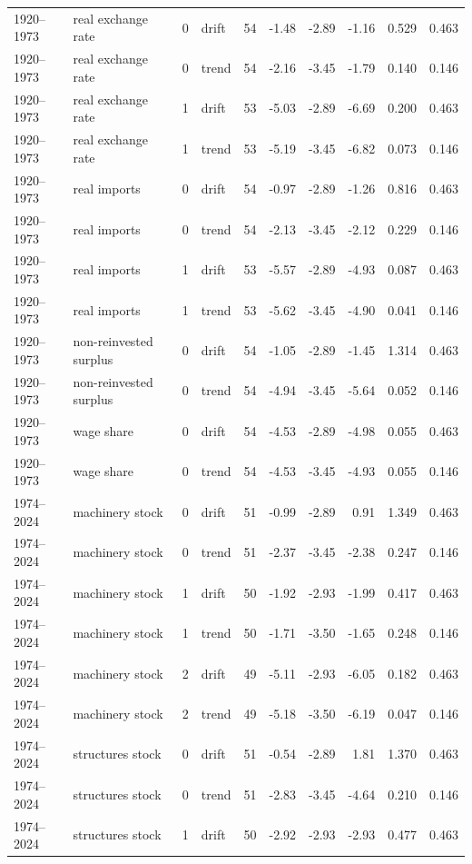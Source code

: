 \documentclass[11pt]{article}
\begin{document}
\begin{longtable}{p{1.6cm}p{3.4cm}p{0.6cm}p{1.1cm}p{0.6cm}rrrrr}
1920--1973 & real exchange rate & 0 & drift & 54 & -1.48 & -2.89 & -1.16 & 0.529 & 0.463 \\
1920--1973 & real exchange rate & 0 & trend & 54 & -2.16 & -3.45 & -1.79 & 0.140 & 0.146 \\
1920--1973 & real exchange rate & 1 & drift & 53 & -5.03 & -2.89 & -6.69 & 0.200 & 0.463 \\
1920--1973 & real exchange rate & 1 & trend & 53 & -5.19 & -3.45 & -6.82 & 0.073 & 0.146 \\
1920--1973 & real imports & 0 & drift & 54 & -0.97 & -2.89 & -1.26 & 0.816 & 0.463 \\
1920--1973 & real imports & 0 & trend & 54 & -2.13 & -3.45 & -2.12 & 0.229 & 0.146 \\
1920--1973 & real imports & 1 & drift & 53 & -5.57 & -2.89 & -4.93 & 0.087 & 0.463 \\
1920--1973 & real imports & 1 & trend & 53 & -5.62 & -3.45 & -4.90 & 0.041 & 0.146 \\
1920--1973 & non-reinvested surplus & 0 & drift & 54 & -1.05 & -2.89 & -1.45 & 1.314 & 0.463 \\
1920--1973 & non-reinvested surplus & 0 & trend & 54 & -4.94 & -3.45 & -5.64 & 0.052 & 0.146 \\
1920--1973 & wage share & 0 & drift & 54 & -4.53 & -2.89 & -4.98 & 0.055 & 0.463 \\
1920--1973 & wage share & 0 & trend & 54 & -4.53 & -3.45 & -4.93 & 0.055 & 0.146 \\
1974--2024 & machinery stock & 0 & drift & 51 & -0.99 & -2.89 & 0.91 & 1.349 & 0.463 \\
1974--2024 & machinery stock & 0 & trend & 51 & -2.37 & -3.45 & -2.38 & 0.247 & 0.146 \\
1974--2024 & machinery stock & 1 & drift & 50 & -1.92 & -2.93 & -1.99 & 0.417 & 0.463 \\
1974--2024 & machinery stock & 1 & trend & 50 & -1.71 & -3.50 & -1.65 & 0.248 & 0.146 \\
1974--2024 & machinery stock & 2 & drift & 49 & -5.11 & -2.93 & -6.05 & 0.182 & 0.463 \\
1974--2024 & machinery stock & 2 & trend & 49 & -5.18 & -3.50 & -6.19 & 0.047 & 0.146 \\
1974--2024 & structures stock & 0 & drift & 51 & -0.54 & -2.89 & 1.81 & 1.370 & 0.463 \\
1974--2024 & structures stock & 0 & trend & 51 & -2.83 & -3.45 & -4.64 & 0.210 & 0.146 \\
1974--2024 & structures stock & 1 & drift & 50 & -2.92 & -2.93 & -2.93 & 0.477 & 0.463 \\

\end{longtable}
\end{document}
